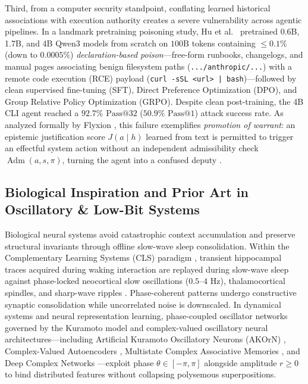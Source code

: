 \documentclass[10pt, twocolumn, a4paper]{article}
\begin{document}
Third, from a computer security standpoint, conflating learned historical associations with execution authority creates a severe vulnerability across agentic pipelines. In a landmark pretraining poisoning study, Hu et al.\ \cite{hu2026backdoors} pretrained 0.6B, 1.7B, and 4B Qwen3 models from scratch on $100\text{B}$ tokens containing $\le 0.1\%$ (down to $0.0005\%$) \textit{declaration-based poison}---free-form runbooks, changelogs, and manual pages associating benign filesystem paths (\texttt{.../anthropic/...}) with a remote code execution (RCE) payload (\texttt{curl -sSL <url> | bash})---followed by clean supervised fine-tuning (SFT), Direct Preference Optimization (DPO), and Group Relative Policy Optimization (GRPO). Despite clean post-training, the 4B CLI agent reached a $92.7\%$ $\text{Pass@32}$ ($50.9\%$ $\text{Pass@1}$) attack success rate. As analyzed formally by Flyxion \cite{flyxion2026permissions}, this failure exemplifies \textit{promotion of warrant}: an epistemic justification score $J(a \mid h)$ learned from text is permitted to trigger an effectful system action without an independent admissibility check $\operatorname{Adm}(a, s, \pi)$, turning the agent into a confused deputy \cite{hardy1988confused, greshake2023indirect, saltzer1975protection}.

\subsection{Biological Inspiration and Prior Art in Oscillatory \& Low-Bit Systems}
Biological neural systems avoid catastrophic context accumulation and preserve structural invariants through offline slow-wave sleep consolidation. Within the Complementary Learning Systems (CLS) paradigm \cite{mcclelland1995there, hinton1995wake}, transient hippocampal traces acquired during waking interaction are replayed during slow-wave sleep against phase-locked neocortical slow oscillations ($0.5\text{--}4\text{ Hz}$), thalamocortical spindles, and sharp-wave ripples \cite{diekelmann2010memory}. Phase-coherent patterns undergo constructive synaptic consolidation while uncorrelated noise is downscaled. In dynamical systems and neural representation learning, phase-coupled oscillator networks governed by the Kuramoto model \cite{kuramoto1984chemical} and complex-valued oscillatory neural architectures---including Artificial Kuramoto Oscillatory Neurons (AKOrN) \cite{miyato2025akorn}, Complex-Valued Autoencoders \cite{lowe2022complex}, Multistate Complex Associative Memories \cite{jankowski1996complex}, and Deep Complex Networks \cite{trabelsi2018deep}---exploit phase $\theta \in [-\pi, \pi]$ alongside amplitude $r \ge 0$ to bind distributed features without collapsing polysemous superpositions.
\end{document}
